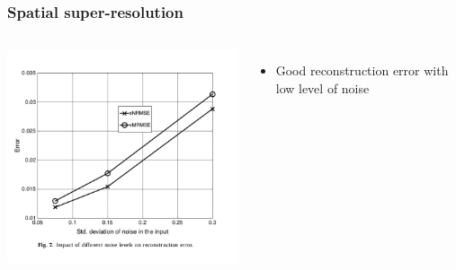 \documentclass{beamer}
\begin{document}
\begin{frame}
    \frametitle{Spatial super-resolution}
\begin{columns}
\includegraphics[scale=0.4]{figures/PINN_error.png}
\begin{itemize}
    \item Good reconstruction error with low level of noise
\end{itemize}
\end{columns}
\end{frame}
\end{document}
